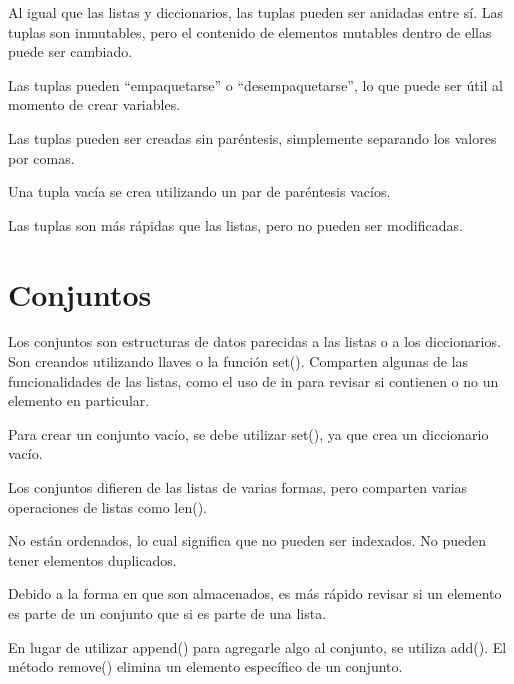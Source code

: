 \documentclass{report}
\newcommand{\doble}[1]{``#1''}
\begin{document}

Al igual que las listas y diccionarios, las tuplas pueden ser anidadas entre sí.
Las tuplas son inmutables, pero el contenido de elementos mutables dentro de ellas puede ser cambiado.


Las tuplas pueden \doble{empaquetarse} o \doble{desempaquetarse}, lo que puede ser útil al momento de crear variables.


Las tuplas pueden ser creadas sin paréntesis, simplemente separando los valores por comas.


Una tupla vacía se crea utilizando un par de paréntesis vacíos.


Las tuplas son más rápidas que las listas, pero no pueden ser modificadas.


\section{Conjuntos}

Los conjuntos son estructuras de datos parecidas a las listas o a los diccionarios. Son creandos utilizando llaves o la función set(). Comparten algunas de las funcionalidades de las listas, como el uso de in para revisar si contienen o no un elemento en particular.


Para crear un conjunto vacío, se debe utilizar set(), ya que {} crea un diccionario vacío.


Los conjuntos difieren de las listas de varias formas, pero comparten varias operaciones de listas como len().

No están ordenados, lo cual significa que no pueden ser indexados. No pueden tener elementos duplicados.

Debido a la forma en que son almacenados, es más rápido revisar si un elemento es parte de un conjunto que si es parte de una lista.

En lugar de utilizar append() para agregarle algo al conjunto, se utiliza add(). El método remove() elimina un elemento específico de un conjunto.
\end{document}
